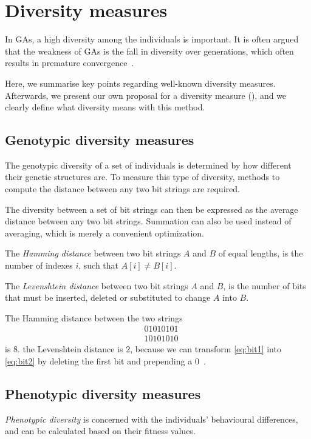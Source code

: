 \section{Diversity measures}
In GAs, a high diversity among the individuals is important. It is often argued that the weakness of GAs is the fall in diversity over generations, which often results in premature convergence~\cite{diaz2007empirical, 1266373,Zitzler00comparisonof}.

Here, we summarise key points regarding well-known diversity measures. Afterwards, we present our own proposal for a diversity measure (\dia), and we clearly define what diversity means with this method.

\subsection{Genotypic diversity measures}
The genotypic diversity of a set of individuals is determined by how different their genetic structures are. To measure this type of diversity, methods to compute the distance between any two bit strings are required.

The diversity between a set of bit strings can then be expressed as the average distance between any two bit strings. Summation can also be used instead of averaging, which is merely a convenient optimization.

The \emph{Hamming distance} between two bit strings $A$ and $B$ of equal lengths, is the number of indexes $i$, such that $A[i] \neq B[i]$.

The \emph{Levenshtein distance} between two bit strings $A$ and $B$, is the number of bits that must be inserted, deleted or substituted to change $A$ into $B$.

The Hamming distance between the two strings
%
\begin{align}
&01010101\label{eq:bit1} \\
&10101010\label{eq:bit2}
\end{align}
%
is 8. the Levenshtein distance is 2, because we can transform \cref{eq:bit1} into \cref{eq:bit2} by deleting the first bit and prepending a $0$~\cite{1250187}.

\subsection{Phenotypic diversity measures}
\emph{Phenotypic diversity} is concerned with the individuals' behavioural differences, and can be calculated based on their fitness values.

